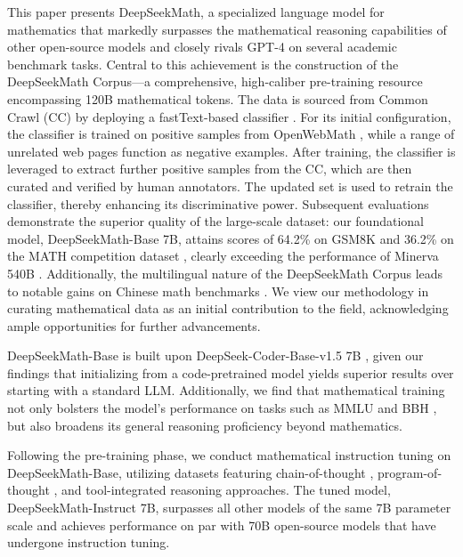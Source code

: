 This paper presents DeepSeekMath, a specialized language model for mathematics that markedly surpasses the mathematical reasoning capabilities of other open-source models and closely rivals GPT-4 on several academic benchmark tasks. Central to this achievement is the construction of the DeepSeekMath Corpus—a comprehensive, high-caliber pre-training resource encompassing 120B mathematical tokens. The data is sourced from Common Crawl (CC) by deploying a fastText-based classifier \citep{joulin2016fasttext}. For its initial configuration, the classifier is trained on positive samples from OpenWebMath \citep{openwebmath}, while a range of unrelated web pages function as negative examples. After training, the classifier is leveraged to extract further positive samples from the CC, which are then curated and verified by human annotators. The updated set is used to retrain the classifier, thereby enhancing its discriminative power. Subsequent evaluations demonstrate the superior quality of the large-scale dataset: our foundational model, DeepSeekMath-Base 7B, attains scores of 64.2\% on GSM8K \citep{gsm8k} and 36.2\% on the MATH competition dataset \citep{MATH}, clearly exceeding the performance of Minerva 540B \citep{minerva}. Additionally, the multilingual nature of the DeepSeekMath Corpus leads to notable gains on Chinese math benchmarks \citep{wei2023cmath,agieval}. We view our methodology in curating mathematical data as an initial contribution to the field, acknowledging ample opportunities for further advancements.

DeepSeekMath-Base is built upon DeepSeek-Coder-Base-v1.5 7B \citep{deepseek-coder}, given our findings that initializing from a code-pretrained model yields superior results over starting with a standard LLM. Additionally, we find that mathematical training not only bolsters the model's performance on tasks such as MMLU \citep{mmlu} and BBH \citep{bbh}, but also broadens its general reasoning proficiency beyond mathematics.

Following the pre-training phase, we conduct mathematical instruction tuning on DeepSeekMath-Base, utilizing datasets featuring chain-of-thought \citep{cot}, program-of-thought \citep{pot,pal}, and tool-integrated reasoning \citep{tora} approaches. The tuned model, DeepSeekMath-Instruct 7B, surpasses all other models of the same 7B parameter scale and achieves performance on par with 70B open-source models that have undergone instruction tuning.

